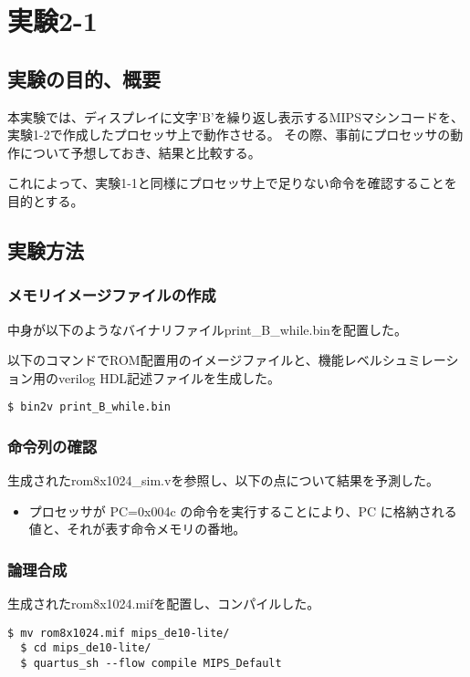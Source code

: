 
\section{実験2-1}
\subsection{実験の目的、概要}
本実験では、ディスプレイに文字'B'を繰り返し表示するMIPSマシンコードを、実験1-2で作成したプロセッサ上で動作させる。
その際、事前にプロセッサの動作について予想しておき、結果と比較する。

これによって、実験1-1と同様にプロセッサ上で足りない命令を確認することを目的とする。

\subsection{実験方法}
\subsubsection{メモリイメージファイルの作成}
中身が以下のようなバイナリファイルprint\_B\_while.binを配置した。


以下のコマンドでROM配置用のイメージファイルと、機能レベルシュミレーション用のverilog HDL記述ファイルを生成した。
\begin{lstlisting}[caption={イメージファイルの作成},label={イメージファイルの作成2-1}]
  $ bin2v print_B_while.bin
\end{lstlisting}

\subsubsection{命令列の確認}
生成されたrom8x1024\_sim.vを参照し、以下の点について結果を予測した。
\begin{itemize}
  \item プロセッサが PC=0x004c の命令を実行することにより、PC に格納される値と、それが表す命令メモリの番地。
\end{itemize}

\subsubsection{論理合成}
生成されたrom8x1024.mifを配置し、コンパイルした。
\begin{lstlisting}[caption={論理合成操作},label={論理合成操作2-1}]
  $ mv rom8x1024.mif mips_de10-lite/
  $ cd mips_de10-lite/
  $ quartus_sh --flow compile MIPS_Default
\end{lstlisting}

